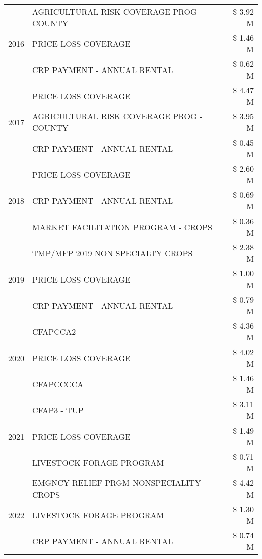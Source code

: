 \begin{tabular}{llr}
\cline{1-3}
\multirow[t]{3}{*}{2016} & AGRICULTURAL RISK COVERAGE PROG - COUNTY & \$ 3.92 M \\
 & PRICE LOSS COVERAGE & \$ 1.46 M \\
 & CRP PAYMENT - ANNUAL RENTAL & \$ 0.62 M \\
\cline{1-3}
\multirow[t]{3}{*}{2017} & PRICE LOSS COVERAGE & \$ 4.47 M \\
 & AGRICULTURAL RISK COVERAGE PROG - COUNTY & \$ 3.95 M \\
 & CRP PAYMENT - ANNUAL RENTAL & \$ 0.45 M \\
\cline{1-3}
\multirow[t]{3}{*}{2018} & PRICE LOSS COVERAGE & \$ 2.60 M \\
 & CRP PAYMENT - ANNUAL RENTAL & \$ 0.69 M \\
 & MARKET FACILITATION PROGRAM - CROPS & \$ 0.36 M \\
\cline{1-3}
\multirow[t]{3}{*}{2019} & TMP/MFP 2019 NON SPECIALTY CROPS & \$ 2.38 M \\
 & PRICE LOSS COVERAGE & \$ 1.00 M \\
 & CRP PAYMENT - ANNUAL RENTAL & \$ 0.79 M \\
\cline{1-3}
\multirow[t]{3}{*}{2020} & CFAPCCA2 & \$ 4.36 M \\
 & PRICE LOSS COVERAGE & \$ 4.02 M \\
 & CFAPCCCCA & \$ 1.46 M \\
\cline{1-3}
\multirow[t]{3}{*}{2021} & CFAP3 - TUP & \$ 3.11 M \\
 & PRICE LOSS COVERAGE & \$ 1.49 M \\
 & LIVESTOCK FORAGE PROGRAM & \$ 0.71 M \\
\cline{1-3}
\multirow[t]{3}{*}{2022} & EMGNCY RELIEF PRGM-NONSPECIALITY CROPS & \$ 4.42 M \\
 & LIVESTOCK FORAGE PROGRAM & \$ 1.30 M \\
 & CRP PAYMENT - ANNUAL RENTAL & \$ 0.74 M \\
\cline{1-3}
\bottomrule
\end{tabular}
